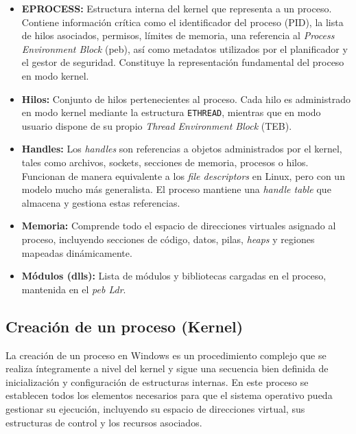 \begin{itemize}
    \item \textbf{EPROCESS:}  
    Estructura interna del kernel que representa a un proceso. Contiene información crítica como el identificador del proceso (PID), la lista de hilos asociados, permisos, límites de memoria, una referencia al \textit{Process Environment Block} (\acrshort{peb}), así como metadatos utilizados por el planificador y el gestor de seguridad. Constituye la representación fundamental del proceso en modo kernel.

    \item \textbf{Hilos:}  
    Conjunto de hilos pertenecientes al proceso. Cada hilo es administrado en modo kernel mediante la estructura \texttt{ETHREAD}, mientras que en modo usuario dispone de su propio \textit{Thread Environment Block} (TEB).

    \item \textbf{Handles:}  
    Los \textit{handles} son referencias a objetos administrados por el kernel, tales como archivos, sockets, secciones de memoria, procesos o hilos. Funcionan de manera equivalente a los \textit{file descriptors} en Linux, pero con un modelo mucho más generalista. El proceso mantiene una \textit{handle table} que almacena y gestiona estas referencias.

    \item \textbf{Memoria:}  
    Comprende todo el espacio de direcciones virtuales asignado al proceso, incluyendo secciones de código, datos, pilas, \textit{heaps} y regiones mapeadas dinámicamente.

    \item \textbf{Módulos (\acrshort{dll}s):}  
    Lista de módulos y bibliotecas cargadas en el proceso, mantenida en el \textit{\acrshort{peb} Ldr}.
\end{itemize}


\subsection{Creación de un proceso (Kernel)}

La creación de un proceso en Windows es un procedimiento complejo que se realiza íntegramente a nivel del kernel y sigue una secuencia bien definida de inicialización y configuración de estructuras internas. En este proceso se establecen todos los elementos necesarios para que el sistema operativo pueda gestionar su ejecución, incluyendo su espacio de direcciones virtual, sus estructuras de control y los recursos asociados.

